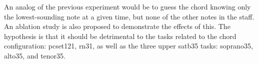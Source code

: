 
An analog of the previous experiment would be to guess the
chord knowing only the lowest-sounding note at a given time,
but none of the other notes in the staff. An ablation study
is also proposed to demonstrate the effects of this. The
hypothesis is that it should be detrimental to the tasks
related to the chord configuration: \gls{pcset121},
\gls{rn31}, as well as the three upper \gls{satb35} tasks:
\gls{soprano35}, \gls{alto35}, and \gls{tenor35}.
